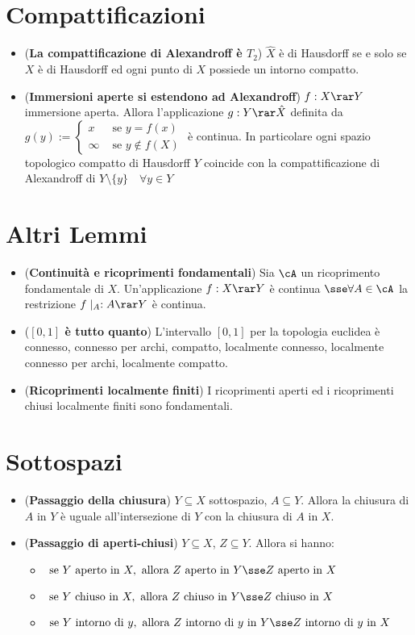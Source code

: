 \documentclass[a4paper,NoNotes,GeneralMath]{stdmdoc}
\newcommand{\apertoin}{\text{ aperto in }}
\newcommand{\chiusoin}{\text{ chiuso in }}
\newcommand{\se}{\text{ se }}
\newcommand{\iin}{\text{ in }}
\newcommand{\intornodi}{\text{ intorno di }}
\newcommand{\allora}{\text{ allora }}
\begin{document}
	\section*{Compattificazioni}
	\begin{itemize}
		\item ({\bf La compattificazione di Alexandroff è $T_2$}) $\hat{X}$ è di Hausdorff se e solo se $X$ è di Hausdorff ed ogni punto di $X$ possiede un intorno compatto.
		\item ({\bf Immersioni aperte si estendono ad Alexandroff}) $f: X \rar Y$ immersione aperta. Allora l'applicazione $g: Y \rar \hat{X}$ definita da $g(y) := \left\{ \begin{array}{cr} x & \text{ se } y = f(x) \\ \infty & \text{ se } y \notin f(X) \end{array} \right.$ è continua. In particolare ogni spazio topologico compatto di Hausdorff $Y$ coincide con la compattificazione di Alexandroff di $Y \setminus \{y\} \quad \forall y \in Y$ 
	\end{itemize}
	
	\section*{Altri Lemmi}
	\begin{itemize}
		\item ({\bf Continuità e ricoprimenti fondamentali}) Sia $\cA$ un ricoprimento fondamentale di $X$. Un'applicazione $f:X \rar Y$ è continua $\sse \forall A \in \cA$ la restrizione $f\mid_A: A \rar Y$ è continua.
		\item ({\bf $[0,1]$ è tutto quanto}) L'intervallo $[0,1]$ per la topologia euclidea è connesso, connesso per archi, compatto, localmente connesso, localmente connesso per archi, localmente compatto.
		\item ({\bf Ricoprimenti localmente finiti}) I ricoprimenti aperti ed i ricoprimenti chiusi localmente finiti sono fondamentali.
	\end{itemize}	

	\section*{Sottospazi}
	\begin{itemize}
		\item ({\bf Passaggio della chiusura}) $Y \subseteq X$ sottospazio, $A \subseteq Y$. Allora la chiusura di $A$ in $Y$ è uguale all'intersezione di $Y$ con la chiusura di $A$ in $X$.
		\item ({\bf Passaggio di aperti-chiusi}) $Y \subseteq X$, $Z \subseteq Y$. Allora si hanno: \\
			\begin{itemize}
				\item $\se Y \apertoin X, \allora Z \apertoin Y \sse Z \apertoin X$
				\item $\se Y \chiusoin X, \allora Z \chiusoin Y \sse Z \chiusoin X$
				\item $\se Y \intornodi y, \allora Z \intornodi y \iin Y \sse Z \intornodi y \iin X$
			\end{itemize}
	\end{itemize}
\end{document}
